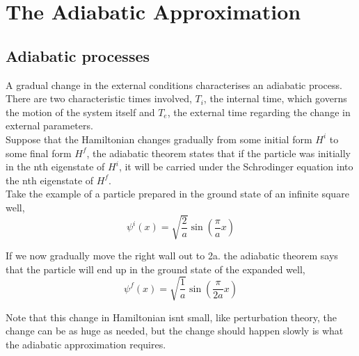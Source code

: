 \section{The Adiabatic Approximation}
\subsection{Adiabatic processes}
A gradual change in the external conditions characterises an adiabatic process. There are two characteristic times involved, $T_i$, the internal time, which governs the motion of the system itself and $T_e$, the external time regarding the change in external parameters.\\

Suppose that the Hamiltonian changes gradually from some initial form $H^i$ to some final form $H^f$, the adiabatic theorem states that if the particle was initially in the nth eigenstate of $H^i$, it will be carried under the Schrodinger equation into the nth eigenstate of $H^f$.\\

Take the example of a particle prepared in the ground state of an infinite square well,
\begin{equation}
	\psi^i(x)=\sqrt{\frac{2}{a}}\sin\left(\frac{\pi}{a}x\right)
\end{equation}

If we now gradually move the right wall out to 2a. the adiabatic theorem says that the particle will end up in the ground state of the expanded well,
\begin{equation}
	\psi^f(x)=\sqrt{\frac{1}{a}}\sin\left(\frac{\pi}{2a}x\right)
\end{equation}

Note that this change in Hamiltonian isnt small, like perturbation theory, the change can be as huge as needed, but the change should happen slowly is what the adiabatic approximation requires.

